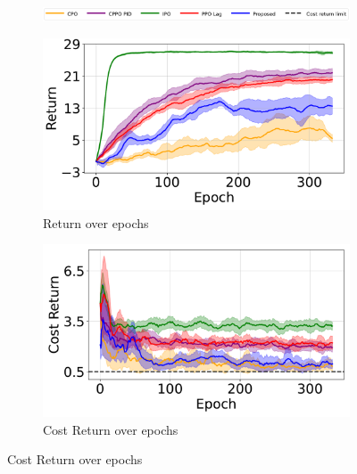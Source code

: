 \begin{figure}[H]
    \centering

    \begin{subfigure}{1.0\textwidth}
        \centering
        \includegraphics[width=\linewidth]{figure/PointGoal/limit 1/legend_common.pdf}
    \end{subfigure}

    \vspace{0.5em} %

    \begin{minipage}{0.48\textwidth}
        \centering
        \begin{subfigure}{\linewidth}
            \centering
            \includegraphics[width=\linewidth]{figure/PointGoal/limit 0.5/EpRet.pdf}
            \caption{Return over epochs}
        \end{subfigure}

        \begin{subfigure}{\linewidth}
            \centering
            \includegraphics[width=\linewidth]{figure/PointGoal/limit 0.5/EpCost.pdf}
            \caption{Cost Return over epochs}
        \end{subfigure}


\end{minipage}
\end{figure}
